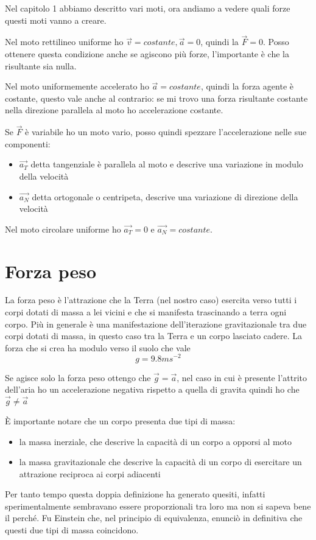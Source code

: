 \documentclass[class=book, crop=false, oneside, 12pt]{standalone}
\begin{document}
Nel capitolo 1 abbiamo descritto vari moti, ora andiamo a vedere quali forze questi moti vanno a creare.

Nel moto rettilineo uniforme ho \(\overrightarrow{v} = costante, \overrightarrow{a} = 0\), quindi la \(\overrightarrow{F} = 0\).
Posso ottenere questa condizione anche se agiscono più forze, l'importante è che la risultante sia nulla.

Nel moto uniformemente accelerato ho \(\overrightarrow{a} = costante\), quindi la forza agente è costante,
questo vale anche al contrario: se mi trovo una forza risultante costante nella direzione parallela al moto ho accelerazione costante.

Se \(\overrightarrow{F}\) è variabile ho un moto vario, posso quindi spezzare l'accelerazione nelle sue componenti:
\begin{itemize}
    \item \(\overrightarrow{a_T}\) detta tangenziale è parallela al moto e descrive una variazione in modulo della velocità
    \item \(\overrightarrow{a_N}\) detta ortogonale o centripeta, descrive una variazione di direzione della velocità
\end{itemize}

Nel moto circolare uniforme ho \(\overrightarrow{a_T} = 0\) e \(\overrightarrow{a_N} = costante\).

\section{Forza peso}

La forza peso è l'attrazione che la Terra (nel nostro caso) esercita verso tutti i corpi dotati di massa a lei vicini e che si manifesta trascinando a terra ogni corpo.
Più in generale è una manifestazione dell'iterazione gravitazionale tra due corpi dotati di massa, in questo caso tra la Terra e un corpo lasciato cadere.
La forza che si crea ha modulo verso il suolo che vale
\begin{equation}
    g = 9.8 ms^{-2}
\end{equation}

Se agisce solo la forza peso ottengo che \(\overrightarrow{g} = \overrightarrow{a}\),
nel caso in cui è presente l'attrito dell'aria ho un accelerazione negativa rispetto a quella di gravita quindi ho che \(\overrightarrow{g} \neq \overrightarrow{a}\)

È importante notare che un corpo presenta due tipi di massa:
\begin{itemize}
    \item la massa inerziale, che descrive la capacità di un corpo a opporsi al moto
    \item la massa gravitazionale che descrive la capacità di un corpo di esercitare un attrazione reciproca ai corpi adiacenti
\end{itemize}
Per tanto tempo questa doppia definizione ha generato quesiti, infatti sperimentalmente sembravano essere proporzionali tra loro ma non si sapeva bene il perché.
Fu Einstein che, nel principio di equivalenza, enunciò in definitiva che questi due tipi di massa coincidono.
\end{document}
